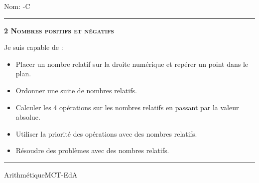\documentclass[11pt,a4paper]{article}
\begin{document}
\begin{titlepage}
    \setlength{\topskip}{0mm}
Nom: \hfill \the\year-C
\vspace{0.5cm}
\hrule

    \centering
    \vspace{0.1\textheight}
	{\bfseries\scshape\Huge 2 Nombres positifs et négatifs\par}
    \vspace{1.5cm}

    {\huge }
	\vspace{1.5cm}
    
    {\large Je suis capable de :}
    \vspace{1.5cm}
    \begin{itemize}
\item Placer un nombre relatif sur la droite numérique et repérer un point dans le plan.
\item Ordonner une suite de nombres relatifs.
\item Calculer les 4 opérations sur les nombres relatifs en passant par la valeur absolue.
\item Utiliser la priorité des opérations avec des nombres relatifs.
\item Résoudre des problèmes avec des nombres relatifs.\end{itemize}

\vfill
\hrule
\vspace{0.5cm}
Arithmétique\hfill MCT-EdA

\end{titlepage}
\end{document}
